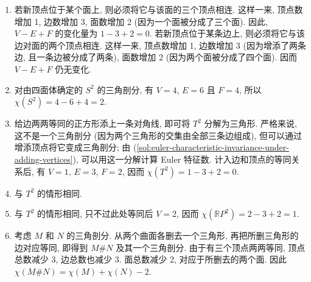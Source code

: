 \begin{description}[font=\normalfont,leftmargin=2em,labelwidth=1.5em]
\begin{enumerate}[label=(\alph*),ref=\alph*,leftmargin=*]
\item\label{sol:euler-characteristic-invariance-under-adding-vertices} 若新顶点位于某个面上, 则必须将它与该面的三个顶点相连. 这样一来, 顶点数增加 1, 边数增加 3, 面数增加 2 (因为一个面被分成了三个面). 因此, $V-E+F$ 的变化量为 $1-3+2=0$. 若新顶点位于某条边上, 则必须将它与该边对面的两个顶点相连. 这样一来, 顶点数增加 1, 边数增加 3 (因为增添了两条边, 且一条边被分成了两条), 面数增加 2 (因为两个面被分成了四个面). 因而 $V-E+F$ 仍无变化.
\item 对由四面体确定的 $S^2$ 的三角剖分, 有 $V=4$, $E=6$ 且 $F=4$, 所以 $\chi(S^2)=4-6+4=2$.
\item 给边两两等同的正方形添上一条对角线, 即可将 $T^2$ 分解为三角形. 严格来说, 这不是一个三角剖分 (因为两个三角形的交集由全部三条边组成), 但可以通过增添顶点将它变成三角剖分; 由 (\ref{sol:euler-characteristic-invariance-under-adding-vertices}), 可以用这一分解计算 Euler 特征数. 计入边和顶点的等同关系后, 有 $V=1$, $E=3$, $F=2$, 因而 $\chi(T^2)=1-3+2=0$.
\item 与 $T^2$ 的情形相同.
\item 与 $T^2$ 的情形相同, 只不过此处等同后 $V=2$, 因而 $\chi(\mathbb{R}P^2)=2-3+2=1$.
\item 考虑 $M$ 和 $N$ 的三角剖分. 从两个曲面各删去一个三角形, 再把所删三角形的边对应等同, 即得到 $M\#N$ 及其一个三角剖分. 由于有三个顶点两两等同, 顶点总数减少 3, 边总数也减少 3. 面总数减少 2, 对应于所删去的两个面. 因此 $\chi(M\#N)=\chi(M)+\chi(N)-2$.
\end{enumerate}
\end{description}

